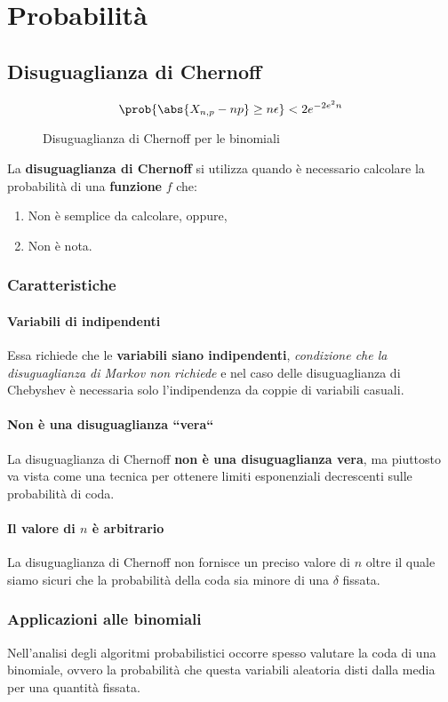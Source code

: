 \documentclass[\main/main.tex]{subfiles}
\begin{document}
\chapter{Probabilità}
\section{Disuguaglianza di Chernoff}
\begin{figure}
  \[
    \prob{\abs{X_{n,p} - np} \geq n\epsilon} < 2e^{-2e^2 n}
  \]
  \caption{Disuguaglianza di Chernoff per le binomiali}
\end{figure}
La \textbf{disuguaglianza di Chernoff} si utilizza quando è necessario calcolare la probabilità di una \textbf{funzione} \(f\) che:
\begin{enumerate}
  \item Non è semplice da calcolare, oppure,
  \item Non è nota.
\end{enumerate}

\subsection{Caratteristiche}
\subsubsection{Variabili di indipendenti}
Essa richiede che le \textbf{variabili siano indipendenti}, \textit{condizione che la disuguaglianza di Markov non richiede} e nel caso delle disuguaglianza di Chebyshev è necessaria solo l'indipendenza da coppie di variabili casuali.

\subsubsection{Non è una disuguaglianza “vera“}
La disuguaglianza di Chernoff \textbf{non è una disuguaglianza vera}, ma piuttosto va vista come una tecnica per ottenere limiti esponenziali decrescenti sulle probabilità di coda.

\subsubsection{Il valore di \(n\) è arbitrario}
La disuguaglianza di Chernoff non fornisce un preciso valore di \(n\) oltre il quale siamo sicuri che la probabilità della coda sia minore di una \(\delta \) fissata.

\subsection{Applicazioni alle binomiali}
Nell'analisi degli algoritmi probabilistici occorre spesso valutare la coda di una binomiale, ovvero la probabilità che questa variabili aleatoria disti dalla media per una quantità fissata.
\end{document}
